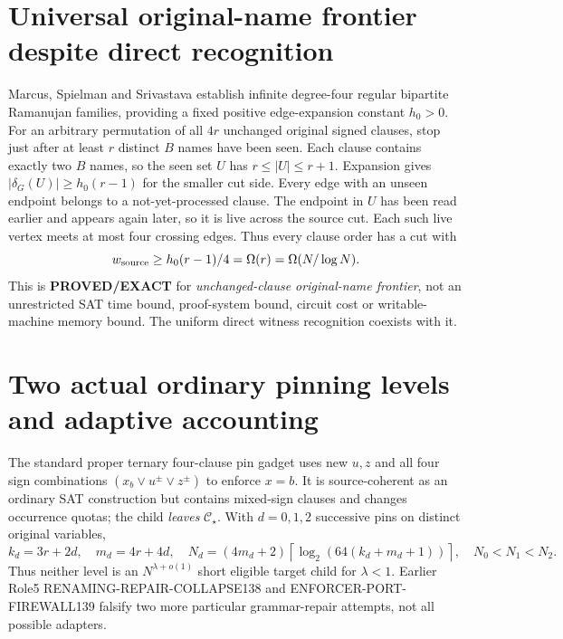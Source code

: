 \documentclass[11pt]{article}
\newcommand{\CS}{\mathcal C_\star}
\begin{document}
\section{Universal original-name frontier despite direct recognition}
Marcus, Spielman and Srivastava \cite{mss} establish infinite degree-four regular bipartite Ramanujan families, providing a fixed positive edge-expansion constant $h_0>0$. For an arbitrary permutation of all $4r$ unchanged original signed clauses, stop just after at least $r$ distinct $B$ names have been seen. Each clause contains exactly two $B$ names, so the seen set $U$ has $r\le|U|\le r+1$. Expansion gives $|\delta_G(U)|\ge h_0(r-1)$ for the smaller cut side. Every edge with an unseen endpoint belongs to a not-yet-processed clause. The endpoint in $U$ has been read earlier and appears again later, so it is live across the source cut. Each such live vertex meets at most four crossing edges. Thus every clause order has a cut with
\[
w_{\rm source}\ge h_0(r-1)/4=\Omega(r)=\Omega(N/\log N).
\]
This is \textbf{PROVED/EXACT} for \emph{unchanged-clause original-name frontier}, not an unrestricted SAT time bound, proof-system bound, circuit cost or writable-machine memory bound. The uniform direct witness recognition coexists with it.

\section{Two actual ordinary pinning levels and adaptive accounting}
The standard proper ternary four-clause pin gadget uses new $u,z$ and all four sign combinations $(x_b\vee u^{\pm}\vee z^{\pm})$ to enforce $x=b$. It is source-coherent as an ordinary SAT construction but contains mixed-sign clauses and changes occurrence quotas; the child \emph{leaves} $\CS$. With $d=0,1,2$ successive pins on distinct original variables,
\[
k_d=3r+2d,\quad m_d=4r+4d,\quad
N_d=(4m_d+2)\left\lceil\log_2(64(k_d+m_d+1))\right\rceil,
\quad N_0<N_1<N_2.
\]
Thus neither level is an $N^{\lambda+o(1)}$ short eligible target child for $\lambda<1$. Earlier Role5 RENAMING-REPAIR-COLLAPSE138 and ENFORCER-PORT-FIREWALL139 falsify two more particular grammar-repair attempts, not all possible adapters.
\end{document}
